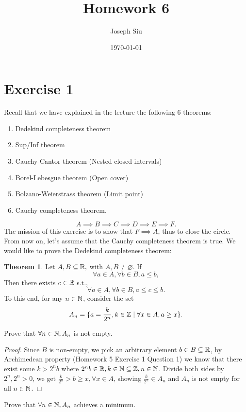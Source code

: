 \documentclass{homework}
\author{Joseph Siu}
\date{\today}
\title{Homework 6}
\newcommand{\R}{\bb{R}} %
\newcommand{\Z}{\bb{Z}} %
\newcommand{\N}{\bb{N}} %
\newcommand{\?}{\stackrel{?}{=}}
\theoremstyle{definition}
\newtheorem*{theorem}{Theorem}
\begin{document}
 \maketitle
\section*{Exercise 1}

Recall that we have explained in the lecture the following 6 theorems:
\begin{enumerate}[label=(\alph*)]
\item Dedekind completeness theorem
\item Sup/Inf theorem
\item Cauchy-Cantor theorem (Nested closed intervals)
\item Borel-Lebesgue theorem (Open cover)
\item Bolzano-Weierstrass theorem (Limit point)
\item Cauchy completeness theorem. 
\end{enumerate}
$$A\implies B\implies C\implies D\implies E\implies F.$$
The mission of this exercise is to show that $F\implies A$, thus to close the circle. From now on, let's assume that the Cauchy completeness theorem is true. We would like to prove the Dedekind completeness theorem:
\begin{theorem}
    Let $A,B\subseteq \R,$ with $A,B\neq\varnothing.$ If $$\forall a\in A,\forall b\in B, a\leq b,$$ Then there exists $c\in\R$ s.t., $$\forall a\in A,\forall b\in B, a\leq c\leq b.$$ To this end, for any $n\in \N$, consider the set $$A_n=\{a=\frac{k}{2^n},k\in\Z\mid\forall x\in A, a\geq x\}.$$
\end{theorem}

\question[1] Prove that $\forall n\in\N, A_n$ is not empty. 

\begin{proof}
    Since $B$ is non-empty, we pick an arbitrary element $b\in B\subseteq\R$, by Archimedean property (Homework 5 Exercise 1 Question 1) we know that there exist some $k>2^nb$ where $2^nb\in\R, k\in\N\subseteq\Z, n\in\N$. Divide both sides by $2^n, 2^n>0$, we get $\frac{k}{2^n}>b\geq x, \forall x\in A$, showing $\frac{k}{2^n}\in A_n$ and $A_n$ is not empty for all $n\in\N$. 
\end{proof}

\question[2] Prove that $\forall n\in\N, A_n$ achieves a minimum.
\end{document}
